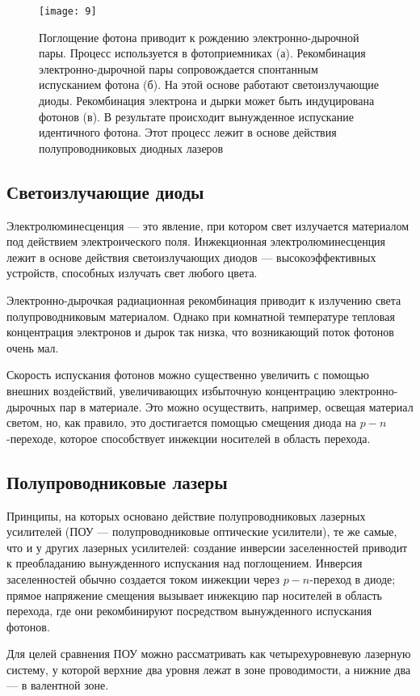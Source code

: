 \documentclass[a4paper, 12pt]{article}
\begin{document}
\begin{figure}[H]
    \texttt{[image: 9]} 
    \caption{Поглощение фотона приводит к рождению электронно-дырочной
    пары. Процесс используется в фотоприемниках (а). Рекомбинация
электронно-дырочной пары сопровождается спонтанным испусканием фотона
(б). На этой основе работают светоизлучающие диоды. Рекомбинация
электрона и дырки может быть индуцирована фотонов (в). В результате
происходит вынужденное испускание идентичного фотона. Этот процесс
лежит в основе действия полупроводниковых диодных лазеров}
\label{fig:9}
\end{figure}


\subsection{Светоизлучающие диоды}
Электролюминесценция --- это явление, при котором свет излучается
материалом под действием электроического поля. Инжекционная
электролюминесценция лежит в основе действия светоизлучающих диодов
--- высокоэффективных устройств, способных излучать свет любого цвета. 

Электронно-дырочкая радиационная рекомбинация приводит к излучению
света полупроводниковым материалом. Однако при комнатной температуре
тепловая концентрация электронов и дырок так низка, что возникающий
поток фотонов очень мал.

Скорость испускания фотонов можно существенно увеличить с помощью
внешних воздействий, увеличивающих избыточную концентрацию
электронно-дырочных пар в материале. Это можно осуществить, например,
освещая материал светом, но, как правило, это достигается помощью
смещения диода на $p-n$-переходе, которое способствует инжекции
носителей в область перехода.

\subsection{Полупроводниковые лазеры}
Принципы, на которых основано действие полупроводниковых лазерных
усилителей (ПОУ --- полупроводниковые оптические усилители), те же
самые, что и у других лазерных усилителей: создание
инверсии заселенностей приводит к преобладанию вынужденного испускания
над поглощением. Инверсия заселенностей обычно создается током
инжекции через $p-n$-переход в диоде; прямое напряжение смещения
вызывает инжекцию пар носителей в область перехода, где они
рекомбинируют посредством вынужденного испускания фотонов. 

Для целей сравнения ПОУ можно рассматривать как четырехуровневую
лазерную систему, у которой верхние два уровня лежат в зоне
проводимости, а нижние два --- в валентной зоне.
\end{document}
